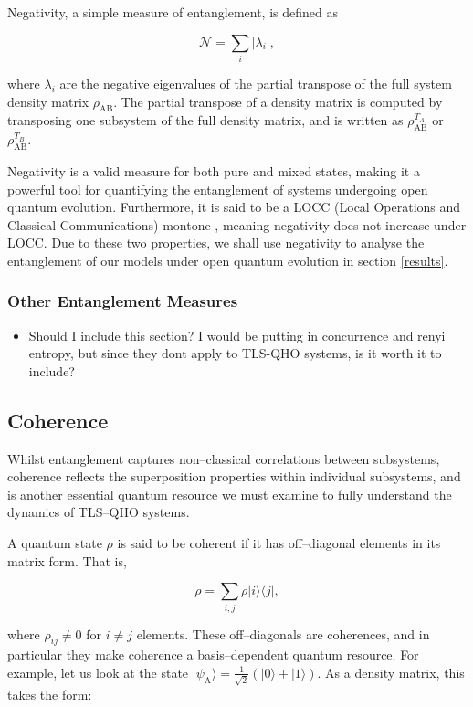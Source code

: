 \documentclass[12pt]{article}
\begin{document}
Negativity, a simple measure of entanglement, is defined as

\begin{equation}
    \mathcal{N} = \sum_i |\lambda_i|,
\end{equation}

where $\lambda_i$ are the negative eigenvalues of the partial transpose of the full system density matrix $\rho_{\scriptscriptstyle \text{AB}}$. The partial transpose of a density matrix is computed by transposing one subsystem of the full density matrix, and is written as $\rho_{\scriptscriptstyle \text{AB}}^{T_A}$ or $\rho_{\scriptscriptstyle \text{AB}}^{T_B}$. 

Negativity is a valid measure for both pure and mixed states, making it a powerful tool for quantifying the entanglement of systems undergoing open quantum evolution. Furthermore, it is said to be a LOCC (Local Operations and Classical Communications) montone \cite{Entanglement2009-Definition}, meaning negativity does not increase under LOCC. Due to these two properties, we shall use negativity to analyse the entanglement of our models under open quantum evolution in section \ref{results}. 
\subsubsection{Other Entanglement Measures}
\begin{itemize}
    \item Should I include this section? I would be putting in concurrence and renyi entropy, but since they dont apply to TLS-QHO systems, is it worth it to include?
\end{itemize}
\subsection{Coherence}

Whilst entanglement captures non--classical correlations between subsystems, coherence reflects the superposition properties within individual subsystems, and is another essential quantum resource we must examine to fully understand the dynamics of TLS--QHO systems.

A quantum state $\rho$ is said to be coherent if it has off--diagonal elements in its matrix form. That is,

\begin{equation}
    \rho = \sum_{i,j}\rho|i\rangle\langle j|,
\end{equation}

where $\rho_{ij} \neq 0$ for $i\neq j$ elements. These off--diagonals are coherences, and in particular they make coherence a basis--dependent quantum resource. For example, let us look at the state $|\psi_{\scriptscriptstyle \text{A}}\rangle = \frac{1}{\sqrt{2}}(|0\rangle + |1\rangle)$. As a density matrix, this takes the form:
\end{document}
